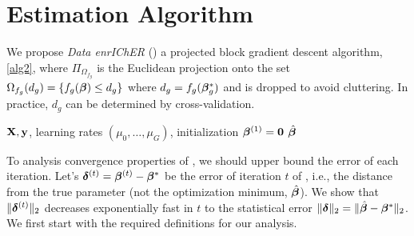 
\section{Estimation Algorithm}
\label{sec:opt}
We propose \emph{Data enrIChER} (\dc) a projected block gradient descent algorithm, \cref{alg2}, where $\Pi_{\Omega_{f_g}}$ is the Euclidean projection onto the set $\Omega_{f_g}(d_g) = \{f_g(\boldsymbol{\beta}) \leq d_g\}$ where $d_g = f_g(\boldsymbol{\beta}_g^*)$ and is dropped to avoid cluttering. In practice, $d_g$ can be determined by cross-validation.

\begin{algorithm}[t]
	\caption{  \dc }
	\label{alg2}
	\begin{algorithmic}[1]
		 $\mathbf{X}, \mathbf{y}$, learning rates $(\mu_0, \dots, \mu_G)$, initialization $\boldsymbol{\beta} ^{(1)} = \mathbf{0}$
		 $\hat{\boldsymbol{\beta}}$
		\ENDFOR
		\ENDFOR
	\end{algorithmic}
\end{algorithm}

To analysis convergence properties of \dc, we should upper bound the error of each iteration.
Let's $\boldsymbol{\delta}^{(t)} = \boldsymbol{\beta}^{(t)} - \boldsymbol{\beta}^*$ be the error of  iteration $t$ of \dc, i.e., the distance from the true parameter (not the optimization minimum, $\hat{\boldsymbol{\beta}}$). We show that $\|\boldsymbol{\delta}^{(t)}\|_{2}$ decreases exponentially fast in $t$ to the statistical error $\|\boldsymbol{\delta}\|_{2} = \|\hat{\boldsymbol{\beta}} - \boldsymbol{\beta}^*\|_{2}$. We first start with the required definitions for our analysis.

